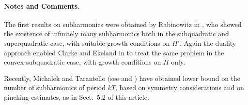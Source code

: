 \documentclass{svproc}
\begin{document}
\paragraph{Notes and Comments.}
The first results on subharmonics were
obtained by Rabinowitz in \cite{smith1981identification}, who showed the existence of
infinitely many subharmonics both in the subquadratic and superquadratic
case, with suitable growth conditions on $H'$. Again the duality
approach enabled Clarke and Ekeland in \cite{smith1981identification} to treat the
same problem in the convex-subquadratic case, with growth conditions on
$H$ only.

Recently, Michalek and Tarantello (see \cite{smith1981identification} and \cite{czajkowski2001grid})
have obtained lower bound on the number of subharmonics of period $kT$,
based on symmetry considerations and on pinching estimates, as in
Sect.~5.2 of this article.

%
%
 

\end{document}

